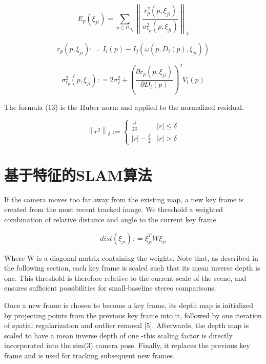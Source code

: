 \begin{equation}
E_{p}(\xi _{ji}) = \sum\limits_{p \in \Omega _{D_{i}}} \left\|  \frac{r_{p}^{2} (p,\xi_{ji})}{\sigma_{r_{p}}^{2} (p,\xi_{ji})}  \right\|_{\delta}
\end{equation}


\begin{equation}
r_{p}(p,\xi _{ji}): = I_{i}(p) - I_{j}(\omega (p,D_{i}(p),\xi _{ji}))
\end{equation}

\begin{equation}
\sigma _{r_{p}} ^{2}(p,\xi _{ji}): = 2\sigma _{I} ^{2} + {\left( \frac {\partial r_{p}(p,\xi_{ji})} {\partial D_{i} (p)} \right)^{2}} V_{i}(p)
\end{equation}

The formula (13) is the Huber norm and applied to the normalized residual.

\begin{equation}
{\left\| r^{2} \right\|_{\delta}}:=\left\{\begin{array}{ll}
\frac {r^{2}} {2\delta}            & |r|\leq \delta       \\
|r|-\frac {\delta} {2}      & |r| > \delta
\end{array} \right.
\end{equation}


\section{基于特征的SLAM算法}
If the camera moves too far away from the existing map, a new key frame is created from the most recent tracked image. We threshold a weighted combination of relative distance and angle to the current key frame

\begin{equation}
dist({\xi _{ji}}): = \xi _{ji}^TW{\xi _{ji}}
\end{equation}

Where W is a diagonal matrix containing the weights. Note that, as described in the following section, each key frame is scaled such that its mean inverse depth is one. This threshold is therefore relative to the current scale of the scene, and ensures sufficient possibilities for small-baseline stereo comparisons.

Once a new frame is chosen to become a key frame, its depth map is initialized by projecting points from the previous key frame into it, followed by one iteration of spatial regularization and outlier removal [5]. Afterwards, the depth map is scaled to have a mean inverse depth of one -this scaling factor is directly incorporated into the sim(3) camera pose. Finally, it replaces the previous key frame and is used for tracking subsequent new frames.


